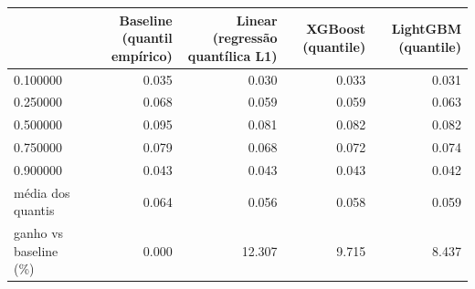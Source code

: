 \begin{tabular}{lrrrr}
\toprule
 & Baseline (quantil empírico) & Linear (regressão quantílica L1) & XGBoost (quantile) & LightGBM (quantile) \\
\midrule
0.100000 & 0.035 & 0.030 & 0.033 & 0.031 \\
0.250000 & 0.068 & 0.059 & 0.059 & 0.063 \\
0.500000 & 0.095 & 0.081 & 0.082 & 0.082 \\
0.750000 & 0.079 & 0.068 & 0.072 & 0.074 \\
0.900000 & 0.043 & 0.043 & 0.043 & 0.042 \\
média dos quantis & 0.064 & 0.056 & 0.058 & 0.059 \\
ganho vs baseline (\%) & 0.000 & 12.307 & 9.715 & 8.437 \\
\bottomrule
\end{tabular}
